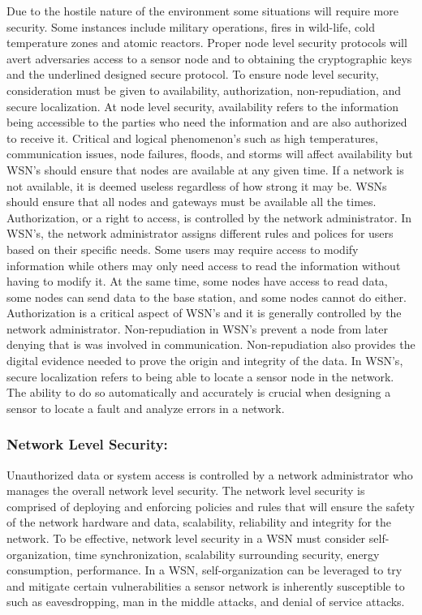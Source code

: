 Due to the hostile nature of the environment some situations will require more security. Some instances include military operations, fires in wild-life, cold temperature zones and atomic reactors. Proper node level security protocols will avert adversaries access to a sensor node and to obtaining the cryptographic keys and the underlined designed secure protocol. To ensure node level security, consideration must be given to availability, authorization, non-repudiation, and secure localization. At node level security, availability refers to the information being accessible to the parties who need the information and are also authorized to receive it. Critical and logical phenomenon’s such as high temperatures, communication issues, node failures, floods, and storms will affect availability but WSN’s should ensure that nodes are available at any given time. If a network is not available, it is deemed useless regardless of how strong it may be. WSNs should ensure that all nodes and gateways must be available all the times. Authorization, or a right to access, is controlled by the network administrator. In WSN’s, the network administrator assigns different rules and polices for users based on their specific needs. Some users may require access to modify information while others may only need access to read the information without having to modify it. At the same time, some nodes have access to read data, some nodes can send data to the base station, and some nodes cannot do either. Authorization is a critical aspect of WSN’s and it is generally controlled by the network administrator. Non-repudiation in WSN’s prevent a node from later denying that is was involved in communication. Non-repudiation also provides the digital evidence needed to prove the origin and integrity of the data. In WSN’s, secure localization refers to being able to locate a sensor node in the network. The ability to do so automatically and accurately is crucial when designing a sensor to locate a fault and analyze errors in a network. 

\subsubsection {Network Level Security:}
\smallskip

Unauthorized data or system access is controlled by a network administrator who manages the overall network level security. The network level security is comprised of deploying and enforcing policies and rules that will ensure the safety of the network hardware and data, scalability, reliability and integrity for the network. To be effective, network level security in a WSN must consider self-organization, time synchronization, scalability surrounding security, energy consumption, performance. In a WSN, self-organization can be leveraged to try and mitigate certain vulnerabilities a sensor network is inherently susceptible to such as eavesdropping, man in the middle attacks, and denial of service attacks.

